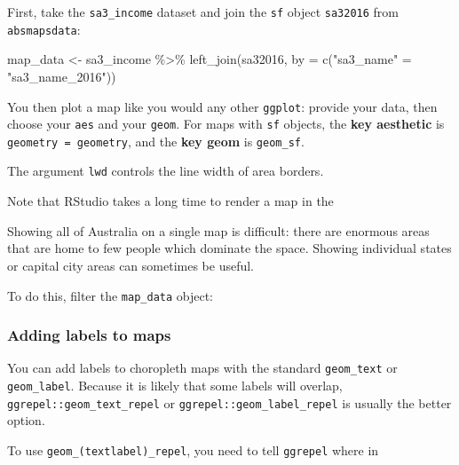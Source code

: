 \documentclass[
]{book}
\newenvironment{Shaded}{\begin{snugshade}}{\end{snugshade}}
\newcommand{\AttributeTok}[1]{\textcolor[rgb]{0.77,0.63,0.00}{#1}}
\newcommand{\FunctionTok}[1]{\textcolor[rgb]{0.00,0.00,0.00}{#1}}
\newcommand{\NormalTok}[1]{#1}
\newcommand{\OtherTok}[1]{\textcolor[rgb]{0.56,0.35,0.01}{#1}}
\newcommand{\SpecialCharTok}[1]{\textcolor[rgb]{0.00,0.00,0.00}{#1}}
\newcommand{\StringTok}[1]{\textcolor[rgb]{0.31,0.60,0.02}{#1}}
\begin{document}
First, take the \texttt{sa3\_income} dataset and join the \texttt{sf} object \texttt{sa32016} from \texttt{absmapsdata}:

\begin{Shaded}
\begin{Highlighting}[]
\NormalTok{map\_data }\OtherTok{\textless{}{-}}\NormalTok{ sa3\_income }\SpecialCharTok{\%\textgreater{}\%} 
  \FunctionTok{left\_join}\NormalTok{(sa32016, }\AttributeTok{by =} \FunctionTok{c}\NormalTok{(}\StringTok{"sa3\_name"} \OtherTok{=} \StringTok{"sa3\_name\_2016"}\NormalTok{))}
\end{Highlighting}
\end{Shaded}

You then plot a map like you would any other \texttt{ggplot}: provide your data, then choose your \texttt{aes} and your \texttt{geom}. For maps with \texttt{sf} objects, the \textbf{key aesthetic} is \texttt{geometry\ =\ geometry}, and the \textbf{key geom} is \texttt{geom\_sf}.

The argument \texttt{lwd} controls the line width of area borders.

Note that RStudio takes a long time to render a map in the

Showing all of Australia on a single map is difficult: there are enormous areas that are home to few people which dominate the space. Showing individual states or capital city areas can sometimes be useful.

To do this, filter the \texttt{map\_data} object:

\hypertarget{adding-labels-to-maps}{%
\subsubsection{Adding labels to maps}\label{adding-labels-to-maps}}

You can add labels to choropleth maps with the standard \texttt{geom\_text} or \texttt{geom\_label}. Because it is likely that some labels will overlap, \texttt{ggrepel::geom\_text\_repel} or \texttt{ggrepel::geom\_label\_repel} is usually the better option.

To use \texttt{geom\_(text\textbar{}label)\_repel}, you need to tell \texttt{ggrepel} where in
\end{document}
